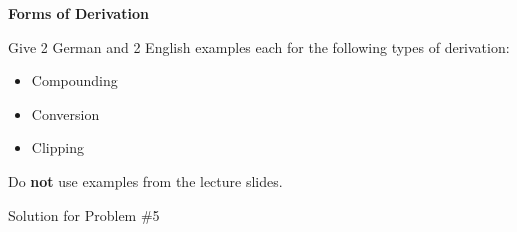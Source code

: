 \documentclass[11pt]{article}
\begin{document}
\vspace*{0.5cm}

\begin{problem}{5}
\textbf{Forms of Derivation}

Give 2 German and 2 English examples each for the following types of derivation:
\begin{itemize}
	\item Compounding
	\item Conversion
	\item Clipping
\end{itemize}

Do \textbf{not} use examples from the lecture slides.

\end{problem}

\begin{solution}
Solution for Problem \#5
\end{solution}

\vspace*{0.5cm}
\end{document}
